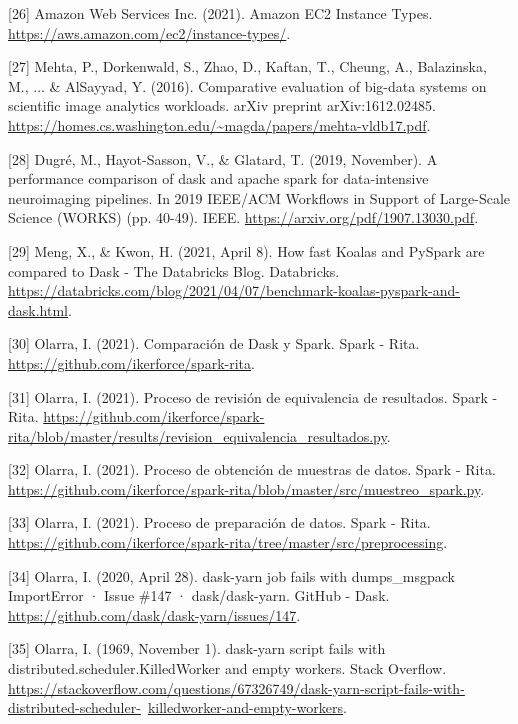 \documentclass[11pt, oneside]{book}
\begin{document}
\begin{thebibliography}{111}
[26] Amazon Web Services Inc. (2021). Amazon EC2 Instance Types.  \url{https://aws.amazon.com/ec2/instance-types/}.

[27] Mehta, P., Dorkenwald, S., Zhao, D., Kaftan, T., Cheung, A., Balazinska, M., ... \& AlSayyad, Y. (2016). Comparative evaluation of big-data systems on scientific image analytics workloads. arXiv preprint arXiv:1612.02485. \url{https://homes.cs.washington.edu/~magda/papers/mehta-vldb17.pdf}. 

[28] Dugré, M., Hayot-Sasson, V., \& Glatard, T. (2019, November). A performance comparison of dask and apache spark for data-intensive neuroimaging pipelines. In 2019 IEEE/ACM Workflows in Support of Large-Scale Science (WORKS) (pp. 40-49). IEEE. \url{https://arxiv.org/pdf/1907.13030.pdf}.

[29] Meng, X., \& Kwon, H. (2021, April 8). How fast Koalas and PySpark are compared to Dask - The Databricks Blog. Databricks. \url{https://databricks.com/blog/2021/04/07/benchmark-koalas-pyspark-and-dask.html}. 

[30] Olarra, I. (2021). Comparación de Dask y Spark. Spark - Rita. \url{https://github.com/ikerforce/spark-rita}.

[31] Olarra, I. (2021). Proceso de revisión de equivalencia de resultados. Spark - Rita. \url{https://github.com/ikerforce/spark-rita/blob/master/results/revision_equivalencia_resultados.py}. 

[32] Olarra, I. (2021). Proceso de obtención de muestras de datos. Spark - Rita. \url{https://github.com/ikerforce/spark-rita/blob/master/src/muestreo_spark.py}.

[33] Olarra, I. (2021). Proceso de preparación de datos. Spark - Rita. \url{https://github.com/ikerforce/spark-rita/tree/master/src/preprocessing}.

[34] Olarra, I. (2020, April 28). dask-yarn job fails with dumps\_msgpack ImportError · Issue \#147 · dask/dask-yarn. GitHub - Dask. \url{https://github.com/dask/dask-yarn/issues/147}. 

[35] Olarra, I. (1969, November 1). dask-yarn script fails with distributed.scheduler.KilledWorker and empty workers. Stack Overflow. \url{https://stackoverflow.com/questions/67326749/dask-yarn-script-fails-with-distributed-scheduler-}\ \url{killedworker-and-empty-workers}. 



\end{thebibliography}
\end{document}
